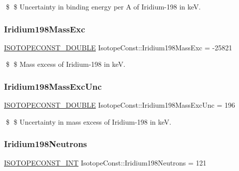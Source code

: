 \$ \$ Uncertainty in binding energy per A of Iridium-\/198 in keV. \mbox{\label{group___isotope_const-_iridium-_ir198_ga40010e014a9e69b687796dafdd8dbf73}} 
\subsubsection{\texorpdfstring{Iridium198\+Mass\+Exc}{Iridium198MassExc}}
{\footnotesize\ttfamily \mbox{\hyperlink{group___isotope_const-_macros_ga8f45a7272ce02c0b4c65c44636ed719a}{I\+S\+O\+T\+O\+P\+E\+C\+O\+N\+S\+T\+\_\+\+D\+O\+U\+B\+LE}} Isotope\+Const\+::\+Iridium198\+Mass\+Exc = -\/25821}

\$ \$ Mass excess of Iridium-\/198 in keV. \mbox{\label{group___isotope_const-_iridium-_ir198_gadef4137c124ffb8058686a3ce3c41509}} 
\subsubsection{\texorpdfstring{Iridium198\+Mass\+Exc\+Unc}{Iridium198MassExcUnc}}
{\footnotesize\ttfamily \mbox{\hyperlink{group___isotope_const-_macros_ga8f45a7272ce02c0b4c65c44636ed719a}{I\+S\+O\+T\+O\+P\+E\+C\+O\+N\+S\+T\+\_\+\+D\+O\+U\+B\+LE}} Isotope\+Const\+::\+Iridium198\+Mass\+Exc\+Unc = 196}

\$ \$ Uncertainty in mass excess of Iridium-\/198 in keV. \mbox{\label{group___isotope_const-_iridium-_ir198_ga682c5fc956f006326885a92248bf9aa9}} 
\subsubsection{\texorpdfstring{Iridium198\+Neutrons}{Iridium198Neutrons}}
{\footnotesize\ttfamily \mbox{\hyperlink{group___isotope_const-_macros_ga5f18360b3e99483a35c32d789e62621c}{I\+S\+O\+T\+O\+P\+E\+C\+O\+N\+S\+T\+\_\+\+I\+NT}} Isotope\+Const\+::\+Iridium198\+Neutrons = 121}

